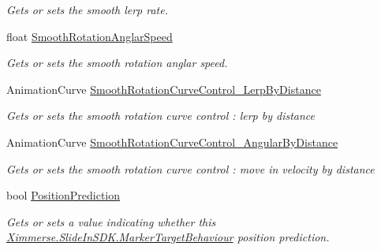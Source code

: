 \begin{DoxyCompactItemize}
\begin{DoxyCompactList}\small\item\em Gets or sets the smooth lerp rate. \end{DoxyCompactList}\item 
float \mbox{\hyperlink{class_ximmerse_1_1_slide_in_s_d_k_1_1_marker_target_behaviour_a80cbafcd63a1a17a9404b8df039f5c2c}{Smooth\+Rotation\+Anglar\+Speed}}
\begin{DoxyCompactList}\small\item\em Gets or sets the smooth rotation anglar speed. \end{DoxyCompactList}\item 
Animation\+Curve \mbox{\hyperlink{class_ximmerse_1_1_slide_in_s_d_k_1_1_marker_target_behaviour_af7024490e3546a491a1a97f1352b7823}{Smooth\+Rotation\+Curve\+Control\+\_\+\+Lerp\+By\+Distance}}
\begin{DoxyCompactList}\small\item\em Gets or sets the smooth rotation curve control \+: lerp by distance \end{DoxyCompactList}\item 
Animation\+Curve \mbox{\hyperlink{class_ximmerse_1_1_slide_in_s_d_k_1_1_marker_target_behaviour_a8e2674c3368291a1a994d864a886f3cd}{Smooth\+Rotation\+Curve\+Control\+\_\+\+Angular\+By\+Distance}}
\begin{DoxyCompactList}\small\item\em Gets or sets the smooth rotation curve control \+: move in velocity by distance \end{DoxyCompactList}\item 
bool \mbox{\hyperlink{class_ximmerse_1_1_slide_in_s_d_k_1_1_marker_target_behaviour_ab61f1b9695362f0e4aa39fb0eb7e4b80}{Position\+Prediction}}
\begin{DoxyCompactList}\small\item\em Gets or sets a value indicating whether this \mbox{\hyperlink{class_ximmerse_1_1_slide_in_s_d_k_1_1_marker_target_behaviour}{Ximmerse.\+Slide\+In\+S\+D\+K.\+Marker\+Target\+Behaviour}} position prediction. \end{DoxyCompactList}\item 

\end{DoxyCompactItemize}
